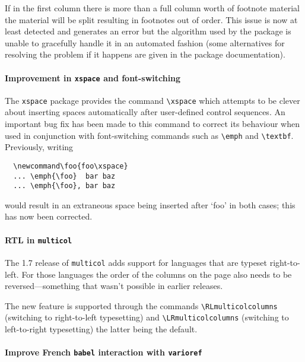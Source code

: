 \documentclass{ltnews}
\begin{document}
If in the first column there is more than a full column worth of footnote
material the material will be split resulting in footnotes out of
order. This issue is now at least detected and generates an error but the algorithm used by the package is
unable to gracefully handle it in an automated fashion (some alternatives for resolving the problem if it happens are given in the package documentation).

\paragraph{Improvement in \texttt{xspace} and font-switching}

The \texttt{xspace} package provides the command \verb|\xspace|
which attempts to be clever about inserting spaces automatically
after user-defined control sequences.
An important bug fix has been made to this command to correct its
behaviour when used in conjunction with font-switching commands
such as \verb|\emph| and \verb|\textbf|.
Previously, writing
\begin{verbatim}
  \newcommand\foo{foo\xspace}
  ... \emph{\foo}  bar baz
  ... \emph{\foo}, bar baz
\end{verbatim}
would result in an extraneous space being inserted after `foo' in
both cases; this has now been corrected.


\paragraph{RTL in \texttt{multicol}}

  The 1.7 release of \texttt{multicol} adds support for languages that are typeset
  right-to-left. For those languages the order of the columns on the page
  also needs to be reversed---something that wasn't possible in earlier releases.

The new feature is supported through the
commands \verb|\RLmulticolcolumns| (switching to right-to-left typesetting)
and \verb|\LRmulticolcolumns| (switching to left-to-right typesetting) the
latter being the default.

\paragraph{Improve French \texttt{babel} interaction with \texttt{varioref}}
\end{document}
